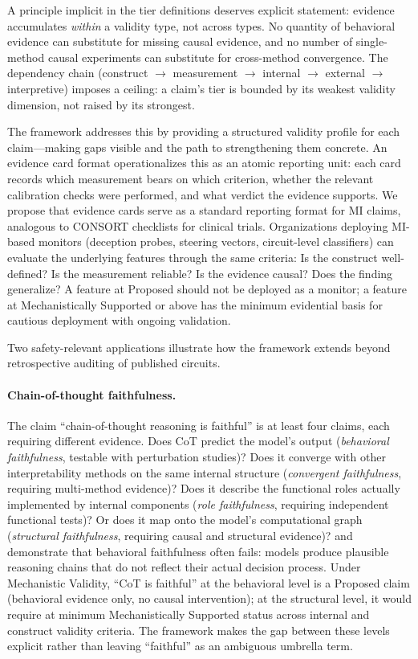 \documentclass{article}
\begin{document}
A principle implicit in the tier definitions deserves explicit statement: evidence accumulates \emph{within} a validity type, not across types.  No quantity of behavioral evidence can substitute for missing causal evidence, and no number of single-method causal experiments can substitute for cross-method convergence.  The dependency chain (construct $\to$ measurement $\to$ internal $\to$ external $\to$ interpretive) imposes a ceiling: a claim's tier is bounded by its weakest validity dimension, not raised by its strongest.

The framework addresses this by providing a structured validity profile for each claim---making gaps visible and the path to strengthening them concrete. An evidence card format operationalizes this as an atomic reporting unit: each card records which measurement bears on which criterion, whether the relevant calibration checks were performed, and what verdict the evidence supports. We propose that evidence cards serve as a standard reporting format for MI claims, analogous to CONSORT checklists for clinical trials. Organizations deploying MI-based monitors (deception probes, steering vectors, circuit-level classifiers) can evaluate the underlying features through the same criteria: Is the construct well-defined? Is the measurement reliable? Is the evidence causal? Does the finding generalize? A feature at Proposed should not be deployed as a monitor; a feature at Mechanistically Supported or above has the minimum evidential basis for cautious deployment with ongoing validation.

Two safety-relevant applications illustrate how the framework extends beyond retrospective auditing of published circuits.

\paragraph{Chain-of-thought faithfulness.}
The claim ``chain-of-thought reasoning is faithful'' is at least four claims, each requiring different evidence.  Does CoT predict the model's output (\emph{behavioral faithfulness}, testable with perturbation studies)?  Does it converge with other interpretability methods on the same internal structure (\emph{convergent faithfulness}, requiring multi-method evidence)?  Does it describe the functional roles actually implemented by internal components (\emph{role faithfulness}, requiring independent functional tests)?  Or does it map onto the model's computational graph (\emph{structural faithfulness}, requiring causal and structural evidence)?  \citet{lanham2023measuring} and \citet{turpin2024unfaithful} demonstrate that behavioral faithfulness often fails: models produce plausible reasoning chains that do not reflect their actual decision process.  Under Mechanistic Validity, ``CoT is faithful'' at the behavioral level is a Proposed claim (behavioral evidence only, no causal intervention); at the structural level, it would require at minimum Mechanistically Supported status across internal and construct validity criteria.  The framework makes the gap between these levels explicit rather than leaving ``faithful'' as an ambiguous umbrella term.
\end{document}
